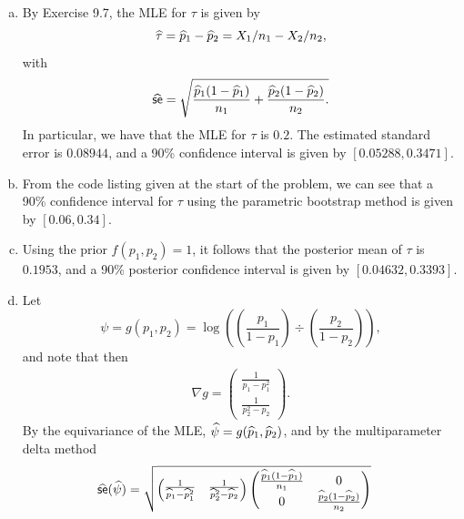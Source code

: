 \begin{ex}~
  \begin{enumerate}[(a)]
    \inputminted{python}{../code/11-04.py}
    \inputminted{text}{../output/11-04.txt}
    \item By Exercise 9.7, the MLE for $\tau$ is given by
          \[
            \widehat{\tau} = \widehat{p}_1 -\widehat{p}_2=X_1/n_1-X_2/n_2,
          \]
          with
          \[
            \widehat{\textsf{se}}=\sqrt{
              \frac{\widehat{p}_1(1-\widehat{p}_1)}{n_1}
              +\frac{\widehat{p}_2(1-\widehat{p}_2)}{n_2}.
            }
          \]
          In particular, we have that the MLE for $\tau$ is $0.2$. The estimated
          standard error is $0.08944$, and a 90\% confidence interval
          is given by $[0.05288, 0.3471]$.
    \item From the code listing given at the start of the problem, we can see
          that a 90\% confidence interval for $\tau$ using the parametric
          bootstrap method is given by $[0.06, 0.34]$.
    \item Using the prior $f(p_1,p_2)=1$, it follows that the posterior mean of
          $\tau$ is $0.1953$, and a 90\% posterior confidence interval is given
          by $[0.04632, 0.3393]$.
    \item Let
          \[
            \psi=g(p_1,p_2)=\log\left(
            \left(\frac{p_1}{1-p_1}\right)\div
            \left(\frac{p_2}{1-p_2}\right)
            \right),
          \]
          and note that then
          \begin{align*}
            \nabla g=\begin{pmatrix}
              \frac{1}{p_1-p_1^2} \\
              \frac{1}{p_2^2-p_2}
            \end{pmatrix}.
          \end{align*}
          By the equivariance of the MLE, $\widehat{\psi}=g(\widehat{p}_1,\widehat{p}_2)$, and by
          the multiparameter delta method
          \begin{align*}
            \widehat{\textsf{se}}(\widehat{\psi})
             & =\sqrt{
              \begin{pmatrix}
                \frac{1}{\widehat{p}_1-\widehat{p}_1^2} &
                \frac{1}{\widehat{p}_2^2-\widehat{p}_2}
              \end{pmatrix}
              \begin{pmatrix}
                \frac{\widehat{p}_1(1-\widehat{p}_1)}{n_1} & 0                              \\
                0                              & \frac{\widehat{p}_2(1-\widehat{p}_2)}{n_2}

\end{pmatrix}}
\end{align*}
\end{enumerate}
\end{ex}
